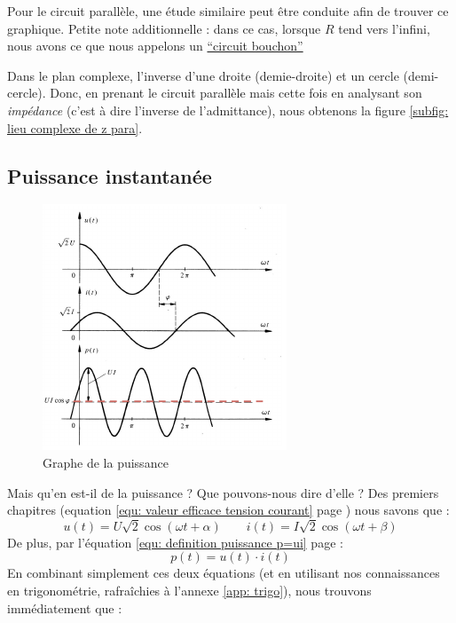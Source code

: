 \documentclass[12pt,a4paper]{article}
\newcommand{\ui}{\uline{I} }
\newcommand{\uu}{\uline{U} }
\begin{document}
Pour le circuit parallèle, une étude similaire peut être conduite afin de trouver ce graphique. Petite note additionnelle : dans ce cas, lorsque $R$ tend vers l'infini, nous avons ce que nous appelons un \uline{``circuit bouchon''}


\noindent{}

Dans le plan complexe, l'inverse d'une droite (demie-droite) et un cercle (demi-cercle). Donc, en prenant le circuit parallèle mais cette fois en analysant son \textit{impédance} (c'est à dire l'inverse de l'admittance), nous obtenons la figure \ref{subfig: lieu complexe de z para}.

\subsection{Puissance instantanée}
\begin{figure}
	\includegraphics[scale=0.8]{images/puissance_instantanee_sinusoidale}
	\caption{Graphe de la puissance}
	\label{sidefig: puissance sinusoidale}
\end{figure}
Mais qu'en est-il de la puissance ? Que pouvons-nous dire d'elle ? Des premiers chapitres (equation \ref{equ: valeur efficace tension courant} page \pageref{equ: valeur efficace tension courant}) nous savons que :
\[u(t) = U \sqrt{2}\cos(\omega t + \alpha) \qquad i(t) = I \sqrt{2}\cos(\omega t + \beta)\]
De plus, par l'équation \ref{equ: definition puissance p=ui} page \pageref{equ: definition puissance p=ui} :
\[p(t) = u(t)\cdot i(t)\]
En combinant simplement ces deux équations (et en utilisant nos connaissances en trigonométrie, rafraîchies à l'annexe \ref{app: trigo}), nous trouvons immédiatement que :\\ 
\end{document}
